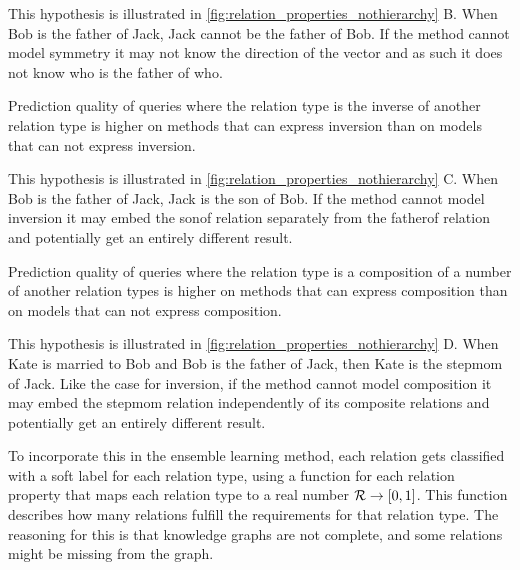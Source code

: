 This hypothesis is illustrated in \autoref{fig:relation_properties_nothierarchy} B. When Bob is the father of Jack, Jack cannot be the father of Bob. If the method cannot model symmetry it may not know the direction of the vector and as such it does not know who is the father of who.

\begin{subhypothesis}
Prediction quality of queries where the relation type is the inverse of another relation type is higher on methods that can express inversion than on models that can not express inversion.
\end{subhypothesis}

This hypothesis is illustrated in \autoref{fig:relation_properties_nothierarchy} C. When Bob is the father of Jack, Jack is the son of Bob. If the method cannot model inversion it may embed the sonof relation separately from the fatherof relation and potentially get an entirely different result.

\begin{subhypothesis}
Prediction quality of queries where the relation type is a composition of a number of another relation types is higher on methods that can express composition than on models that can not express composition.
\end{subhypothesis}

This hypothesis is illustrated in \autoref{fig:relation_properties_nothierarchy} D. When Kate is married to Bob and Bob is the father of Jack, then Kate is the stepmom of Jack. Like the case for inversion, if the method cannot model composition it may embed the stepmom relation independently of its composite relations and potentially get an entirely different result.

% 


To incorporate this in the ensemble learning method, each relation gets classified with a soft label for each relation type, using a function for each relation property that maps each relation type to a real number $\mathcal{R} \rightarrow [ 0 , 1 ]$. This function describes how many relations fulfill the requirements for that relation type. The reasoning for this is that knowledge graphs are not complete, and some relations might be missing from the graph.

